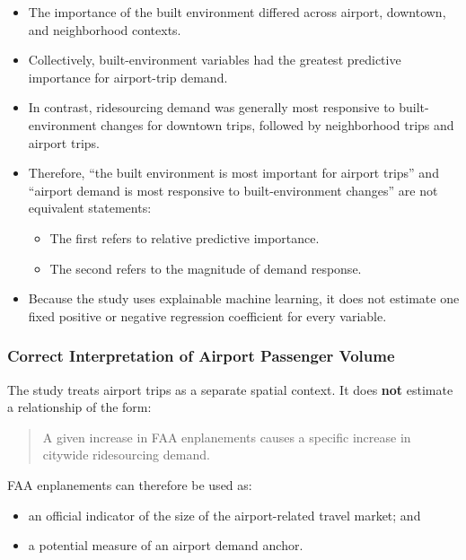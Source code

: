 \documentclass[10pt,a4paper]{article}
\providecommand{\tightlist}{\setlength{\itemsep}{0pt}\setlength{\parskip}{0pt}}
\begin{document}
\begin{itemize}
\tightlist
\item
  The importance of the built environment differed across airport, downtown, and neighborhood contexts.
\item
  Collectively, built-environment variables had the greatest predictive importance for airport-trip demand.
\item
  In contrast, ridesourcing demand was generally most responsive to built-environment changes for downtown trips, followed by neighborhood trips and airport trips.
\item
  Therefore, ``the built environment is most important for airport trips'' and ``airport demand is most responsive to built-environment changes'' are not equivalent statements:

  \begin{itemize}
  \tightlist
  \item
    The first refers to relative predictive importance.
  \item
    The second refers to the magnitude of demand response.
  \end{itemize}
\item
  Because the study uses explainable machine learning, it does not estimate one fixed positive or negative regression coefficient for every variable.
\end{itemize}

\hypertarget{correct-interpretation-of-airport-passenger-volume}{%
\subsubsection{Correct Interpretation of Airport Passenger Volume}\label{correct-interpretation-of-airport-passenger-volume}}

The study treats airport trips as a separate spatial context. It does \textbf{not} estimate a relationship of the form:

\begin{quote}
A given increase in FAA enplanements causes a specific increase in citywide ridesourcing demand.
\end{quote}

FAA enplanements can therefore be used as:

\begin{itemize}
\tightlist
\item
  an official indicator of the size of the airport-related travel market; and
\item
  a potential measure of an airport demand anchor.
\end{itemize}
\end{document}
